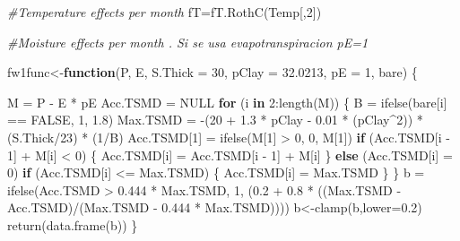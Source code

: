 \documentclass[
  10pt,
  b5paper,
]{book}
\newenvironment{Shaded}{\begin{snugshade}}{\end{snugshade}}
\newcommand{\AttributeTok}[1]{\textcolor[rgb]{0.77,0.63,0.00}{#1}}
\newcommand{\CommentTok}[1]{\textcolor[rgb]{0.56,0.35,0.01}{\textit{#1}}}
\newcommand{\ConstantTok}[1]{\textcolor[rgb]{0.00,0.00,0.00}{#1}}
\newcommand{\ControlFlowTok}[1]{\textcolor[rgb]{0.13,0.29,0.53}{\textbf{#1}}}
\newcommand{\DecValTok}[1]{\textcolor[rgb]{0.00,0.00,0.81}{#1}}
\newcommand{\FloatTok}[1]{\textcolor[rgb]{0.00,0.00,0.81}{#1}}
\newcommand{\FunctionTok}[1]{\textcolor[rgb]{0.00,0.00,0.00}{#1}}
\newcommand{\NormalTok}[1]{#1}
\newcommand{\OtherTok}[1]{\textcolor[rgb]{0.56,0.35,0.01}{#1}}
\newcommand{\SpecialCharTok}[1]{\textcolor[rgb]{0.00,0.00,0.00}{#1}}
\begin{document}
\begin{Shaded}
\begin{Highlighting}[]
\CommentTok{\#Temperature effects per month}
\NormalTok{fT}\OtherTok{=}\FunctionTok{fT.RothC}\NormalTok{(Temp[,}\DecValTok{2}\NormalTok{]) }

\CommentTok{\#Moisture effects per month . Si se usa evapotranspiracion pE=1}

\NormalTok{fw1func}\OtherTok{\textless{}{-}}\ControlFlowTok{function}\NormalTok{(P, E, }\AttributeTok{S.Thick =} \DecValTok{30}\NormalTok{, }\AttributeTok{pClay =} \FloatTok{32.0213}\NormalTok{, }\AttributeTok{pE =} \DecValTok{1}\NormalTok{, bare) }
\NormalTok{\{}
   
\NormalTok{    M }\OtherTok{=}\NormalTok{ P }\SpecialCharTok{{-}}\NormalTok{ E }\SpecialCharTok{*}\NormalTok{ pE}
\NormalTok{    Acc.TSMD }\OtherTok{=} \ConstantTok{NULL}
    \ControlFlowTok{for}\NormalTok{ (i }\ControlFlowTok{in} \DecValTok{2}\SpecialCharTok{:}\FunctionTok{length}\NormalTok{(M)) \{}
\NormalTok{    B }\OtherTok{=} \FunctionTok{ifelse}\NormalTok{(bare[i] }\SpecialCharTok{==} \ConstantTok{FALSE}\NormalTok{, }\DecValTok{1}\NormalTok{, }\FloatTok{1.8}\NormalTok{)}
\NormalTok{     Max.TSMD }\OtherTok{=} \SpecialCharTok{{-}}\NormalTok{(}\DecValTok{20} \SpecialCharTok{+} \FloatTok{1.3} \SpecialCharTok{*}\NormalTok{ pClay }\SpecialCharTok{{-}} \FloatTok{0.01} \SpecialCharTok{*}\NormalTok{ (pClay}\SpecialCharTok{\^{}}\DecValTok{2}\NormalTok{)) }\SpecialCharTok{*}\NormalTok{ (S.Thick}\SpecialCharTok{/}\DecValTok{23}\NormalTok{) }\SpecialCharTok{*}\NormalTok{ (}\DecValTok{1}\SpecialCharTok{/}\NormalTok{B)}
\NormalTok{        Acc.TSMD[}\DecValTok{1}\NormalTok{] }\OtherTok{=} \FunctionTok{ifelse}\NormalTok{(M[}\DecValTok{1}\NormalTok{] }\SpecialCharTok{\textgreater{}} \DecValTok{0}\NormalTok{, }\DecValTok{0}\NormalTok{, M[}\DecValTok{1}\NormalTok{])}
        \ControlFlowTok{if}\NormalTok{ (Acc.TSMD[i }\SpecialCharTok{{-}} \DecValTok{1}\NormalTok{] }\SpecialCharTok{+}\NormalTok{ M[i] }\SpecialCharTok{\textless{}} \DecValTok{0}\NormalTok{) \{}
\NormalTok{            Acc.TSMD[i] }\OtherTok{=}\NormalTok{ Acc.TSMD[i }\SpecialCharTok{{-}} \DecValTok{1}\NormalTok{] }\SpecialCharTok{+}\NormalTok{ M[i]}
\NormalTok{        \}}
        \ControlFlowTok{else}\NormalTok{ (Acc.TSMD[i] }\OtherTok{=} \DecValTok{0}\NormalTok{)}
        \ControlFlowTok{if}\NormalTok{ (Acc.TSMD[i] }\SpecialCharTok{\textless{}=}\NormalTok{ Max.TSMD) \{}
\NormalTok{            Acc.TSMD[i] }\OtherTok{=}\NormalTok{ Max.TSMD}
\NormalTok{        \}}
\NormalTok{    \}}
\NormalTok{    b }\OtherTok{=} \FunctionTok{ifelse}\NormalTok{(Acc.TSMD }\SpecialCharTok{\textgreater{}} \FloatTok{0.444} \SpecialCharTok{*}\NormalTok{ Max.TSMD, }\DecValTok{1}\NormalTok{, (}\FloatTok{0.2} \SpecialCharTok{+} \FloatTok{0.8} \SpecialCharTok{*}\NormalTok{ ((Max.TSMD }\SpecialCharTok{{-}} 
\NormalTok{        Acc.TSMD)}\SpecialCharTok{/}\NormalTok{(Max.TSMD }\SpecialCharTok{{-}} \FloatTok{0.444} \SpecialCharTok{*}\NormalTok{ Max.TSMD))))}
\NormalTok{    b}\OtherTok{\textless{}{-}}\FunctionTok{clamp}\NormalTok{(b,}\AttributeTok{lower=}\FloatTok{0.2}\NormalTok{)}
    \FunctionTok{return}\NormalTok{(}\FunctionTok{data.frame}\NormalTok{(b))}
\NormalTok{\}}



\end{Highlighting}
\end{Shaded}
\end{document}
